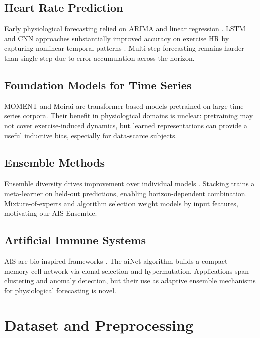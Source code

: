 \documentclass[conference]{IEEEtran}
\begin{document}
\subsection{Heart Rate Prediction}
Early physiological forecasting relied on ARIMA and linear regression
\cite{box2015}. LSTM and CNN approaches substantially improved accuracy on
exercise HR by capturing nonlinear temporal patterns \cite{nakamura2020}.
Multi-step forecasting remains harder than single-step due to error
accumulation across the horizon.

\subsection{Foundation Models for Time Series}
MOMENT \cite{goswami2024moment} and Moirai \cite{woo2024moirai} are
transformer-based models pretrained on large time series corpora. Their benefit
in physiological domains is unclear: pretraining may not cover exercise-induced
dynamics, but learned representations can provide a useful inductive bias,
especially for data-scarce subjects.

\subsection{Ensemble Methods}
Ensemble diversity drives improvement over individual models \cite{makridakis2018m4}.
Stacking \cite{wolpert1992} trains a meta-learner on held-out predictions,
enabling horizon-dependent combination. Mixture-of-experts \cite{jacobs1991}
and algorithm selection \cite{rice1976} weight models by input features,
motivating our AIS-Ensemble.

\subsection{Artificial Immune Systems}
AIS are bio-inspired frameworks \cite{dasgupta1999}. The aiNet algorithm
\cite{decastro2000} builds a compact memory-cell network via clonal selection
and hypermutation. Applications span clustering and anomaly detection, but
their use as adaptive ensemble mechanisms for physiological forecasting is novel.

\section{Dataset and Preprocessing}
\label{sec:data}
\end{document}
